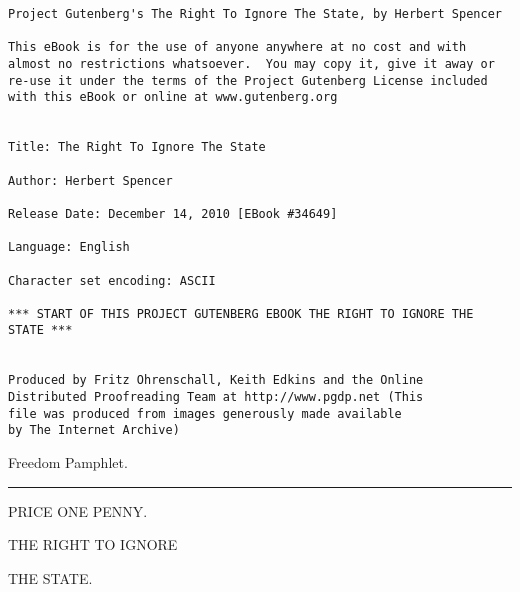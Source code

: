 \documentclass[oneside]{book}
\begin{document}
\begin{verbatim}
Project Gutenberg's The Right To Ignore The State, by Herbert Spencer

This eBook is for the use of anyone anywhere at no cost and with
almost no restrictions whatsoever.  You may copy it, give it away or
re-use it under the terms of the Project Gutenberg License included
with this eBook or online at www.gutenberg.org


Title: The Right To Ignore The State

Author: Herbert Spencer

Release Date: December 14, 2010 [EBook #34649]

Language: English

Character set encoding: ASCII

*** START OF THIS PROJECT GUTENBERG EBOOK THE RIGHT TO IGNORE THE STATE ***


Produced by Fritz Ohrenschall, Keith Edkins and the Online
Distributed Proofreading Team at http://www.pgdp.net (This
file was produced from images generously made available
by The Internet Archive)
\end{verbatim}
\newpage











\begin{center}{\large Freedom Pamphlet.}\end{center}

\hrule

\vspace{\baselineskip}

\begin{center}{\large PRICE ONE PENNY.}\end{center}

\vspace{\baselineskip}

\begin{center}{\Huge THE RIGHT TO IGNORE}\end{center}
\begin{center}{\Huge THE STATE.}\end{center}

\vspace{\baselineskip}
\end{document}
